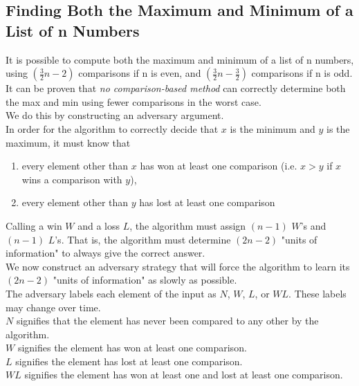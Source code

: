\documentclass[12pt]{article}
\theoremstyle{plain}
\theoremstyle{definition}
\newcommand{\lecture}[1]{\marginpar{{\footnotesize $\leftarrow$ \underline{#1}}}}
\begin{document}
\subsection{Finding Both the Maximum and Minimum of a List of n Numbers}
It is possible to compute both the maximum and minimum of a list of n numbers, using $(\frac{3}{2}n - 2)$ comparisons if n is even, and $(\frac{3}{2}n - \frac{3}{2})$ comparisons if n is odd. \\
It can be proven that \emph{no comparison-based method} can correctly determine both the max and min using fewer comparisons in the worst case. \\

We do this by constructing an adversary argument. \\

In order for the algorithm to correctly decide that $x$ is the minimum and $y$ is the maximum, it must know that
\begin{enumerate}
  \item every element other than $x$ has won at least one comparison (i.e. $x > y$ if $x$ wins a comparison with $y$),
  \item every element other than $y$ has lost at least one comparison
\end{enumerate}
Calling a win $W$ and a loss $L$, the algorithm must assign $(n - 1)$ $W$'s and $(n - 1)$ $L$'s.
That is, the algorithm must determine $(2n - 2)$ "units of information" to always give the correct answer. \\

We now construct an adversary strategy that will force the algorithm to learn its $(2n - 2)$ "units of information" as slowly as possible. \\
The adversary labels each element of the input as $N$, $W$, $L$, or $WL$.
These labels may change over time. \\
$N$ signifies that the element has never been compared to any other by the algorithm. \\
$W$ signifies the element has won at least one comparison. \\
$L$ signifies the element has lost at least one comparison. \\
$WL$ signifies the element has won at least one and lost at least one comparison. \\

\lecture{October 27, 2016}
\end{document}
